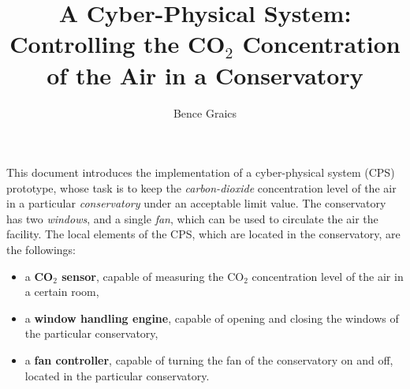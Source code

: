 \documentclass[a4paper, 11pt]{article}
\begin{document}
	
	\newcommand{\specialcell}[2][c]{%
		\begin{tabular}[#1]{@{}c@{}}#2\end{tabular}}
	
	\newenvironment*{mytable}[3]{
		\begin{table}[htbp]	
			\caption{#1}          
			\label{tab:#2}            
			\center%
			\begin{tabular}{#3}
			}
			{
			\end{tabular}
		\end{table}
	}
	
	\pagestyle{plain}
	
	
	
	\nonfrenchspacing
	\setlength{\parindent}{0em}
	\setlength{\parskip}{0.45em}
	
	\title{A Cyber-Physical System:\\Controlling the CO$_2$ Concentration of the Air in a Conservatory}
	\date{}
	\author{Bence Graics}	
	
	\maketitle
	
	This document introduces the implementation of a cyber-physical system (CPS) prototype, whose task is to keep the \emph{carbon-dioxide} concentration level of the air in a particular \emph{conservatory} under an acceptable limit value.
	The conservatory has two \emph{windows}, and a single \emph{fan}, which can be used to circulate the air the facility. The local elements of the CPS, which are located in the conservatory, are the followings:
	\begin{itemize}
		\item a \textbf{CO$_2$ sensor}, capable of measuring the CO$_2$ concentration level of the air in a certain room,
		\item a \textbf{window handling engine}, capable of opening and closing the windows of the particular conservatory,
		\item a \textbf{fan controller}, capable of turning the fan of the conservatory on and off, located in the particular conservatory.
	\end{itemize}
	
\end{document}
